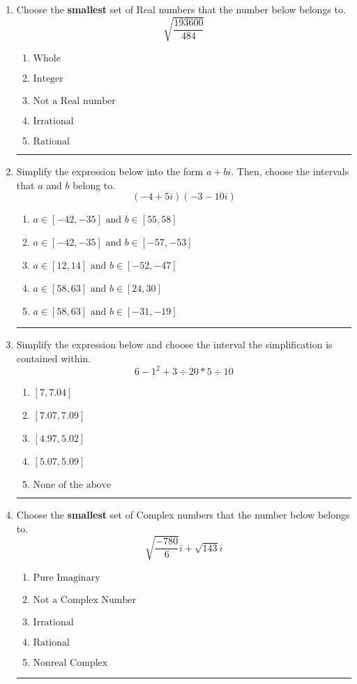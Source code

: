 \documentclass[14pt]{extbook}
\newcommand{\litem}[1]{\item#1\hspace*{-1cm}\rule{\textwidth}{0.4pt}}
\begin{document}
\begin{enumerate}
\litem{
Choose the \textbf{smallest} set of Real numbers that the number below belongs to.\[ \sqrt{\frac{193600}{484}} \]\begin{enumerate}[label=\Alph*.]
\item \( \text{Whole} \)
\item \( \text{Integer} \)
\item \( \text{Not a Real number} \)
\item \( \text{Irrational} \)
\item \( \text{Rational} \)

\end{enumerate} }
\litem{
Simplify the expression below into the form $a+bi$. Then, choose the intervals that $a$ and $b$ belong to.\[ (-4 + 5 i)(-3 - 10 i) \]\begin{enumerate}[label=\Alph*.]
\item \( a \in [-42, -35] \text{ and } b \in [55, 58] \)
\item \( a \in [-42, -35] \text{ and } b \in [-57, -53] \)
\item \( a \in [12, 14] \text{ and } b \in [-52, -47] \)
\item \( a \in [58, 63] \text{ and } b \in [24, 30] \)
\item \( a \in [58, 63] \text{ and } b \in [-31, -19] \)

\end{enumerate} }
\litem{
Simplify the expression below and choose the interval the simplification is contained within.\[ 6 - 1^2 + 3 \div 20 * 5 \div 10 \]\begin{enumerate}[label=\Alph*.]
\item \( [7, 7.04] \)
\item \( [7.07, 7.09] \)
\item \( [4.97, 5.02] \)
\item \( [5.07, 5.09] \)
\item \( \text{None of the above} \)

\end{enumerate} }
\litem{
Choose the \textbf{smallest} set of Complex numbers that the number below belongs to.\[ \sqrt{\frac{-780}{6}} i+\sqrt{143}i \]\begin{enumerate}[label=\Alph*.]
\item \( \text{Pure Imaginary} \)
\item \( \text{Not a Complex Number} \)
\item \( \text{Irrational} \)
\item \( \text{Rational} \)
\item \( \text{Nonreal Complex} \)


\end{enumerate}}
\end{enumerate}
\end{document}
